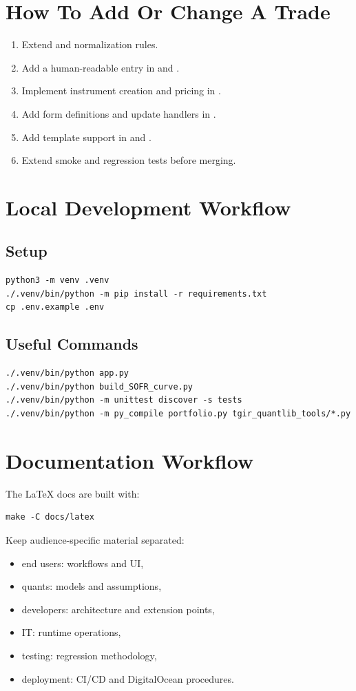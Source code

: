 \documentclass[11pt]{article}
\begin{document}
\section{How To Add Or Change A Trade}
\begin{enumerate}[leftmargin=1.5em]
    \item Extend  and normalization rules.
    \item Add a human-readable entry in  and .
    \item Implement instrument creation and pricing in .
    \item Add form definitions and update handlers in .
    \item Add template support in  and .
    \item Extend smoke and regression tests before merging.
\end{enumerate}

\section{Local Development Workflow}
\subsection{Setup}
\begin{lstlisting}
python3 -m venv .venv
./.venv/bin/python -m pip install -r requirements.txt
cp .env.example .env
\end{lstlisting}

\subsection{Useful Commands}
\begin{lstlisting}
./.venv/bin/python app.py
./.venv/bin/python build_SOFR_curve.py
./.venv/bin/python -m unittest discover -s tests
./.venv/bin/python -m py_compile portfolio.py tgir_quantlib_tools/*.py
\end{lstlisting}

\section{Documentation Workflow}
The LaTeX docs are built with:
\begin{lstlisting}
make -C docs/latex
\end{lstlisting}
Keep audience-specific material separated:
\begin{itemize}[leftmargin=1.5em]
    \item end users: workflows and UI,
    \item quants: models and assumptions,
    \item developers: architecture and extension points,
    \item IT: runtime operations,
    \item testing: regression methodology,
    \item deployment: CI/CD and DigitalOcean procedures.
\end{itemize}
\end{document}
